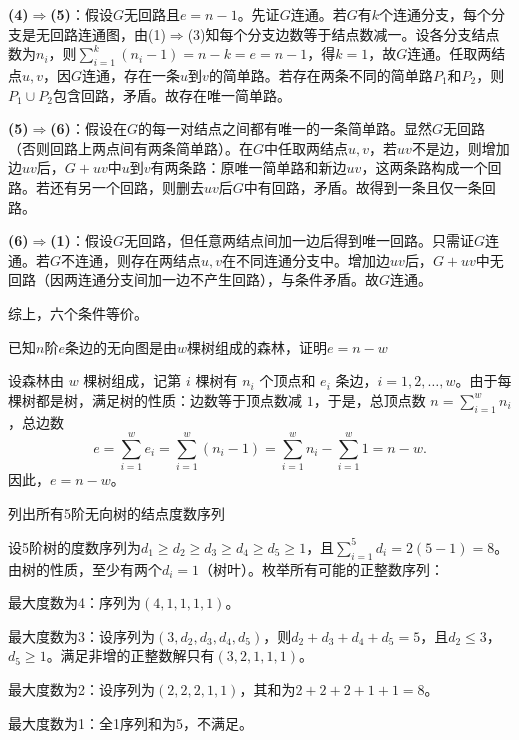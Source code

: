 \documentclass[lang=cn,11pt]{elegantbook}
\begin{document}
\textbf{(4)$\Rightarrow$(5)}：假设$G$无回路且$e=n-1$。先证$G$连通。若$G$有$k$个连通分支，每个分支是无回路连通图，由(1)$\Rightarrow$(3)知每个分支边数等于结点数减一。设各分支结点数为$n_i$，则$\sum_{i=1}^k (n_i-1)=n-k=e=n-1$，得$k=1$，故$G$连通。任取两结点$u,v$，因$G$连通，存在一条$u$到$v$的简单路。若存在两条不同的简单路$P_1$和$P_2$，则$P_1\cup P_2$包含回路，矛盾。故存在唯一简单路。

\textbf{(5)$\Rightarrow$(6)}：假设在$G$的每一对结点之间都有唯一的一条简单路。显然$G$无回路（否则回路上两点间有两条简单路）。在$G$中任取两结点$u,v$，若$uv$不是边，则增加边$uv$后，$G+uv$中$u$到$v$有两条路：原唯一简单路和新边$uv$，这两条路构成一个回路。若还有另一个回路，则删去$uv$后$G$中有回路，矛盾。故得到一条且仅一条回路。

\textbf{(6)$\Rightarrow$(1)}：假设$G$无回路，但任意两结点间加一边后得到唯一回路。只需证$G$连通。若$G$不连通，则存在两结点$u,v$在不同连通分支中。增加边$uv$后，$G+uv$中无回路（因两连通分支间加一边不产生回路），与条件矛盾。故$G$连通。

综上，六个条件等价。
\begin{example}
    已知$n$阶$e$条边的无向图是由$w$棵树组成的森林，证明$e=n-w$
\end{example}
设森林由 $w$ 棵树组成，记第 $i$ 棵树有 $n_i$ 个顶点和 $e_i$ 条边，$i=1,2,\dots,w$。由于每棵树都是树，满足树的性质：边数等于顶点数减 $1$，于是，总顶点数 $n = \sum_{i=1}^w n_i$，总边数
    \[
    e = \sum_{i=1}^w e_i = \sum_{i=1}^w (n_i - 1) = \sum_{i=1}^w n_i - \sum_{i=1}^w 1 = n - w.
    \]
    因此，$e = n - w$。
\begin{example}
列出所有5阶无向树的结点度数序列
\end{example}
设5阶树的度数序列为$d_1 \ge d_2 \ge d_3 \ge d_4 \ge d_5 \ge 1$，且$\displaystyle\sum_{i=1}^5 d_i = 2(5-1) = 8$。由树的性质，至少有两个$d_i = 1$（树叶）。枚举所有可能的正整数序列：

最大度数为4：序列为$(4,1,1,1,1)$。
 
最大度数为3：设序列为$(3, d_2, d_3, d_4, d_5)$，则$d_2 + d_3 + d_4 + d_5 = 5$，且$d_2 \le 3$，$d_5 \ge 1$。满足非增的正整数解只有$(3,2,1,1,1)$。

最大度数为2：设序列为$(2,2,2,1,1)$，其和为$2+2+2+1+1=8$。

最大度数为1：全1序列和为5，不满足。
\end{document}
